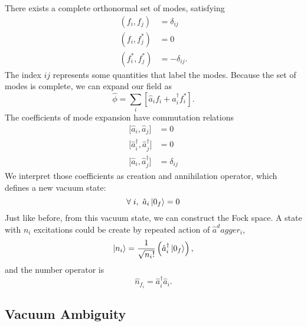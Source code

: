 \documentclass[12pt]{article}
\numberwithin{equation}{subsection}
\theoremstyle{mystyle}{\newtheorem{definition}{Definition}[subsection]}
\theoremstyle{mystyle}{\newtheorem{theorem}[definition]{Theorem}}
\theoremstyle{mystyle}{\newtheorem*{remark}{Remark}}
\theoremstyle{mystyle}{\newtheorem{example}{Example}[subsection]}
\theoremstyle{mystyle}{\newtheorem{examples}{Examples}[subsection]}
\theoremstyle{mystyle}{\newtheorem{cthm}{}[subsection]}
\begin{document}
There exists a complete orthonormal set of modes, satisfying
\begin{align}
  \left(f_{i},f_{j}\right)     & =\delta_{ij}   \\
  \left(f_{i},f^*_{j}\right)   & =0             \\
  \left(f^*_{i},f^*_{j}\right) & =-\delta_{ij}.
\end{align}
The index \(ij\) represents some quantities that label the modes.
Because the set of modes is complete, we can expand our field as
\begin{equation}
  \hat{\phi}=\sum_i\left[\hat{a}_i f_i+\hat{a}_i^\dagger f_i^*\right].
\end{equation}
The coefficients of mode expansion have commutation relations
\begin{align}
  \bigl[\hat{a}_{i},\hat{a}_{j}\bigr]                     & =0           \\
  \bigl[\hat{a}^{\dagger}_{i},\hat{a}^{\dagger}_{j}\bigr] & =0           \\
  \bigl[\hat{a}_{i},\hat{a}^{\dagger}_{j}\bigr]           & =\delta_{ij}
\end{align}
We interpret those coefficients as creation and annihilation operator, which defines a new vacuum state:
\begin{equation}
  \forall\;i,\ \hat{a}_i\ket{0_f}=0
\end{equation}
Just like before, from this vacuum state, we can construct the Fock space.
A state with \(n_i\) excitations could be create by repeated action of \(\hat{a}^dagger_i\),
\begin{equation}
  \ket{n_i}=\frac{1}{\sqrt{n_i!}}\left(\hat{a}_i^{\dagger}\ket{0_f}\right),
\end{equation}
and the number operator is 
\begin{equation}
  \hat{n}_{f_i}=\hat{a}_i^\dagger \hat{a}_i.
\end{equation}












\subsection{Vacuum Ambiguity}
\end{document}
